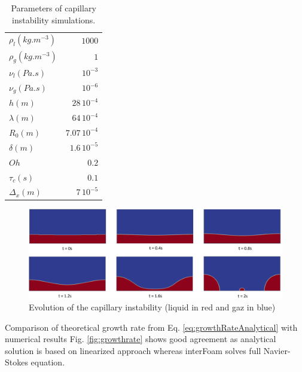 \documentclass[twocolumn,10pt]{asme2ej}
\begin{document}
\begin{table}
    \begin{center}
        \begin{tabular}{lr}
            \hline
            $\rho_{l} (kg.m^{-3})$ & $1000$\\
            $\rho_{g} (kg.m^{-3})$ & $1$\\
            $\nu_{l} (Pa.s)$ & $10^{-3}$\\
            $\nu_{g} (Pa.s)$ & $10^{-6}$\\
            $h(m)$ & $28\, 10^{-4}$\\
            $\lambda (m)$ & $64\, 10^{-4}$\\
            $R_0(m)$ & $7.07\, 10^{-4}$\\
            $\delta (m)$ & $1.6\, 10^{-5}$\\
            $Oh$ & $0.2$\\
            $\tau_{c}(s)$ & $0.1$  \\   
            $\Delta_x(m)$ & $7\,10^{-5}$ \\      
            \hline
        \end{tabular}
    \end{center}
    
    \caption{\label{tab:parametersPinch}Parameters of capillary instability simulations.}
\end{table}

\begin{figure}[t]
    \centering
    \includegraphics[width=\textwidth]{pinch.png}
    \caption{Evolution of the capillary instability (liquid in red and gaz in blue)} 
    \label{fig:capillaryGrowth}
\end{figure}

Comparison of theoretical growth rate from Eq. \ref{eq:growthRateAnalytical} with numerical results Fig. \ref{fig:growthrate} shows good agreement as analytical solution is based on linearized approach whereas interFoam solves full Navier-Stokes equation.
\end{document}
